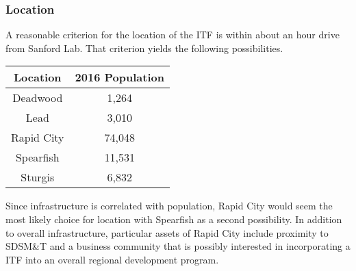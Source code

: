 \subsubsection{Location }
A reasonable criterion for the location of the ITF is within about an
hour drive from Sanford Lab. That criterion yields the following
possibilities.
\begin{center}
\begin{tabular}{ |c|c| } \hline
{\bf Location} & {\bf 2016 Population}  \\ \hline 
Deadwood & 1,264  \\ 
Lead & 3,010  \\
Rapid City & 74,048  \\
Spearfish & 11,531  \\
Sturgis & 6,832  \\ \hline
\end{tabular}
\end{center}
Since infrastructure is correlated with population, Rapid City would
seem the most likely choice for location with Spearfish as a second
possibility. In addition to overall infrastructure, particular assets
of Rapid City include proximity to SDSM\&T and a business community
that is possibly interested in incorporating a  ITF into
an overall regional development program.

